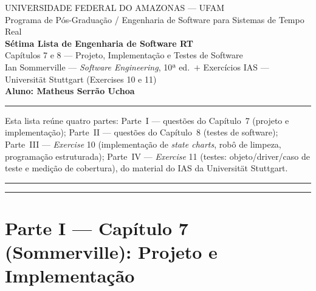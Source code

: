 \documentclass[11pt,a4paper]{article}
\begin{document}

\begin{center}
  {\large UNIVERSIDADE FEDERAL DO AMAZONAS — UFAM}\\[2pt]
  {\normalsize Programa de Pós-Graduação / Engenharia de Software para Sistemas de Tempo Real}\\[10pt]
  {\Large\bfseries Sétima Lista de Engenharia de Software RT}\\[5pt]
  {\large Capítulos 7 e 8 — Projeto, Implementação e Testes de Software}\\[3pt]
  {\normalsize Ian Sommerville — \textit{Software Engineering}, 10ª ed.\ \;$+$\;
   Exercícios IAS — Universität Stuttgart (Exercises 10 e 11)}\\[8pt]
  {\normalsize\bfseries Aluno: Matheus Serrão Uchoa}
\end{center}
\hrule\vspace{4pt}
{\small Esta lista reúne quatro partes: Parte~I — questões do Capítulo~7
(projeto e implementação); Parte~II — questões do Capítulo~8 (testes de
software); Parte~III — \textit{Exercise} 10 (implementação de \textit{state
charts}, robô de limpeza, programação estruturada); Parte~IV — \textit{Exercise}
11 (testes: objeto/driver/caso de teste e medição de cobertura), do material do
IAS da Universität Stuttgart.}
\vspace{4pt}\hrule

\tableofcontents
\vspace{6pt}\hrule

\section{Parte I — Capítulo 7 (Sommerville): Projeto e Implementação}

\end{document}

